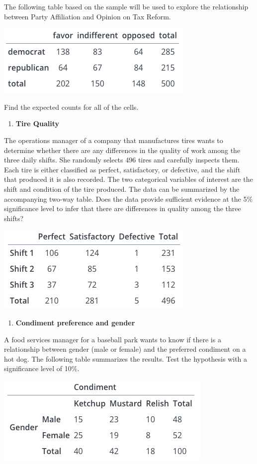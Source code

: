 \documentclass[
]{book}
\providecommand{\tightlist}{%
  \setlength{\itemsep}{0pt}\setlength{\parskip}{0pt}}
\begin{document}
The following table based on the sample will be used to explore the relationship between Party Affiliation and Opinion on Tax Reform.

\begin{center}\includegraphics[width=0.35\linewidth]{week13/practiceEx02Data} \end{center}

Find the expected counts for all of the cells.

\begin{enumerate}
\def\labelenumi{\arabic{enumi}.}
\setcounter{enumi}{2}
\tightlist
\item
  \textbf{Tire Quality}
\end{enumerate}

The operations manager of a company that manufactures tires wants to determine whether there are any differences in the quality of work among the three daily shifts. She randomly selects 496 tires and carefully inspects them. Each tire is either classified as perfect, satisfactory, or defective, and the shift that produced it is also recorded. The two categorical variables of interest are the shift and condition of the tire produced. The data can be summarized by the accompanying two-way table. Does the data provide sufficient evidence at the 5\% significance level to infer that there are differences in quality among the three shifts?

\begin{center}\includegraphics[width=0.35\linewidth]{week13/practiceEx03Data} \end{center}

\begin{enumerate}
\def\labelenumi{\arabic{enumi}.}
\setcounter{enumi}{3}
\tightlist
\item
  \textbf{Condiment preference and gender}
\end{enumerate}

A food services manager for a baseball park wants to know if there is a relationship between gender (male or female) and the preferred condiment on a hot dog. The following table summarizes the results. Test the hypothesis with a significance level of 10\%.

\begin{center}\includegraphics[width=0.35\linewidth]{week13/practiceEx04Data} \end{center}

  
\end{document}

